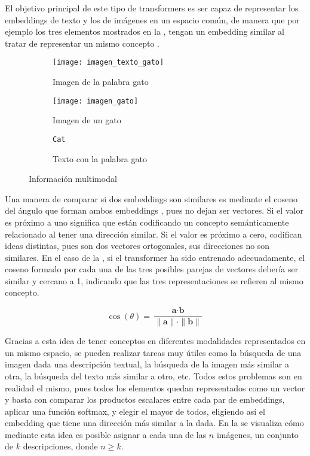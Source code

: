 			El objetivo principal de este tipo de transformers es ser capaz de representar los embeddings de texto y los de imágenes en un espacio común, de manera que por ejemplo los tres elementos mostrados en la , tengan un embedding similar al tratar de representar un mismo concepto \cite{multimodal_transformers}.
			
			\begin{figure}[!h]
				\centering
				\begin{subfigure}{.3\textwidth}
					\centering
					\texttt{[image: imagen\_texto\_gato]}
					\caption{Imagen de la palabra gato}
				\end{subfigure}\hfill
				\begin{subfigure}{.3\textwidth}
					\centering
					\texttt{[image: imagen\_gato]}
					\caption{Imagen de un gato}
				\end{subfigure}
				\begin{subfigure}{.3\textwidth}
					\begin{minipage}[position][2.5cm][c]{\textwidth}
						\centering
						\Large\texttt{Cat}
					\end{minipage}
					\caption{Texto con la palabra gato}
				\end{subfigure}
				\caption{Información multimodal \cite{vertex}}
				\label{fig:info_multi}
			\end{figure} 
			
			Una manera de comparar si dos embeddings son similares es mediante el coseno del ángulo que forman ambos embeddings \cite{cosine}, pues no dejan ser vectores. Si el valor es próximo a uno significa que están codificando un concepto semánticamente relacionado al tener una dirección similar. Si el valor es próximo a cero, codifican ideas distintas, pues son dos vectores ortogonales, sus direcciones no son similares. En el caso de la , si el transformer ha sido entrenado adecuadamente, el coseno formado por cada una de las tres posibles parejas de vectores debería ser similar y cercano a 1, indicando que las tres representaciones se refieren al mismo concepto. 
			
			$$
			\cos(\theta) = \frac{\textbf{a} \cdot \textbf{b}}{\|\textbf{a}\|\cdot\|\textbf{b}\|}
			$$
			
			Gracias a esta idea de tener conceptos en diferentes modalidades representados en un mismo espacio, se pueden realizar tareas muy útiles como la búsqueda de una imagen dada una descripción textual, la búsqueda de la imagen más similar a otra, la búsqueda del texto más similar a otro, etc. Todos estos problemas son en realidad el mismo, pues todos los elementos quedan representados como un vector y basta con comparar los productos escalares entre cada par de embeddings, aplicar una función softmax, y elegir el mayor de todos, eligiendo así el embedding que tiene una dirección más similar a la dada. En la  se visualiza cómo mediante esta idea es posible asignar a cada una de las $n$ imágenes, un conjunto de $k$ descripciones, donde $n \geq k$. 
			
